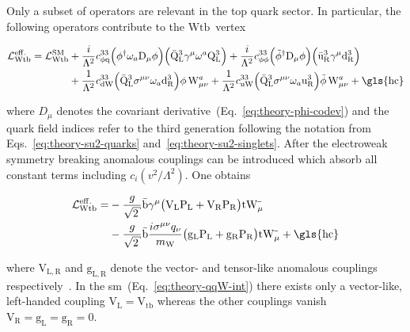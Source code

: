 Only a subset of operators are relevant in the top quark sector. In particular, the following operators contribute to the $\mathrm{Wtb}$~vertex

\begin{align}
\mathcal{L}^\mathrm{eff.}_\mathrm{Wtb}=\mathcal{L}^\mathrm{SM}_\mathrm{Wtb}&+\frac{i}{\Lambda^2}c_{\phi\mathrm{q}}^{33}\Big(\phi^\dagger\omega_{a}\mathrm{D}_\mu\phi\Big)\Big(\bar{\mathrm{Q}}_\mathrm{L}^{3}\gamma^{\mu}\omega^{a}\mathrm{Q}_\mathrm{L}^{3}\Big)+\frac{i}{\Lambda^2}c_{\phi\phi}^{33}\Big(\tilde{\phi}^\dagger\mathrm{D}_\mu\phi\Big)\Big(\bar{\mathrm{u}}_\mathrm{R}^{3}\gamma^{\mu}\mathrm{d}_\mathrm{R}^{3}\Big) \nonumber\\
&+\frac{1}{\Lambda^2}c_{\mathrm{dW}}^{33}\Big(\bar{\mathrm{Q}}_\mathrm{L}^{3}\sigma^{\mu\nu}\omega_{a}\mathrm{d}_\mathrm{R}^{3}\Big)\phi\,\mathrm{W}^{a}_{\mu\nu}+\frac{1}{\Lambda^2}c_{\mathrm{uW}}^{33}\Big(\bar{\mathrm{Q}}_\mathrm{L}^{3}\sigma^{\mu\nu}\omega_{a}\mathrm{u}_\mathrm{R}^{3}\Big)\tilde{\phi}\,\mathrm{W}^{a}_{\mu\nu}+\mathrm{\gls{hc}} \label{eq:theory-eft-lagrangian-operators}
\end{align}

where $D_\mu$ denotes the covariant derivative~(Eq.~\ref{eq:theory-phi-codev}) and the quark field indices refer to the third generation following the notation from Eqs.~\ref{eq:theory-su2-quarks} and~\ref{eq:theory-su2-singlets}. After the electroweak symmetry breaking anomalous couplings can be introduced which absorb all constant terms including $c_{i}(v^2/\Lambda^2)$. One obtains

\begin{align}
\mathcal{L}^\mathrm{eff.}_\mathrm{Wtb}=&-\frac{g}{\sqrt{2}}\bar{\mathrm{b}}\gamma^{\mu}\big(\mathrm{V}_\mathrm{L}\mathrm{P}_\mathrm{L}+\mathrm{V}_\mathrm{R}\mathrm{P}_\mathrm{R}\big)\mathrm{t}\mathrm{W}_\mu^{\rmminus}\\
&-\frac{g}{\sqrt{2}}\bar{\mathrm{b}}\frac{i\sigma^{\mu\nu}q_\nu}{m_\mathrm{W}}\big(\mathrm{g}_\mathrm{L}\mathrm{P}_\mathrm{L}+\mathrm{g}_\mathrm{R}\mathrm{P}_\mathrm{R}\big)\mathrm{t}\mathrm{W}_\mu^{\rmminus}+\mathrm{\gls{hc}}
\end{align}

where $\mathrm{V}_\mathrm{L,R}$ and $\mathrm{g}_\mathrm{L,R}$ denote the vector- and tensor-like anomalous couplings respectively~\cite{AguilarSaavedra:2008zc}. In the \gls{sm}~(Eq.~\ref{eq:theory-qqW-int}) there exists only a vector-like, left-handed coupling $\mathrm{V}_\mathrm{L}=\mathrm{V}_\mathrm{tb}$ whereas the other couplings vanish $\mathrm{V}_\mathrm{R}=\mathrm{g}_\mathrm{L}=\mathrm{g}_\mathrm{R}=0$.

